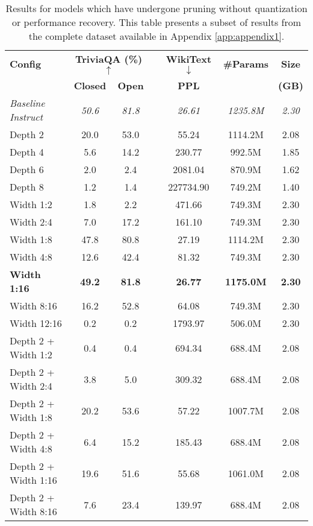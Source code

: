 {\begin{table}[!htbp]
\centering
\footnotesize
\caption[Results for Pruning-Only Configurations (Subset)]{Results for models which have undergone pruning without quantization or performance recovery. This table presents a subset of results from the complete dataset available in Appendix \ref{app:appendix1}.} \label{tab:pruning_only_results}
\label{tab:depth_pruning_results}
\begin{tabular}{lcccccc}
\hline
\textbf{Config} & \multicolumn{2}{c}{\textbf{TriviaQA (\%) $\uparrow$}} & & \textbf{WikiText $\downarrow$} & \textbf{\#Params} & \textbf{Size} \\
\cline{2-3}
& \textbf{Closed} & \textbf{Open} & & \textbf{PPL} & & \textbf{(GB)} \\
\hline
\textit{Baseline Instruct} & \textit{50.6} & \textit{81.8} & & \textit{26.61} & \textit{1235.8M} & \textit{2.30} \\
Depth 2 & 20.0 & 53.0 & & 55.24 & 1114.2M & 2.08 \\
Depth 4 & 5.6 & 14.2 & & 230.77 & 992.5M & 1.85 \\
Depth 6 & 2.0 & 2.4 & & 2081.04 & 870.9M & 1.62 \\
Depth 8 & 1.2 & 1.4 & & 227734.90 & 749.2M & 1.40 \\
Width 1:2 & 1.8 & 2.2 & & 471.66 & 749.3M & 2.30 \\
Width 2:4 & 7.0 & 17.2 & & 161.10 & 749.3M & 2.30 \\
Width 1:8 & 47.8 & 80.8 & & 27.19 & 1114.2M & 2.30 \\
Width 4:8 & 12.6 & 42.4 & & 81.32 & 749.3M & 2.30 \\
\textbf{Width 1:16} & \textbf{49.2} & \textbf{81.8} & & \textbf{26.77} & \textbf{1175.0M} & \textbf{2.30} \\
Width 8:16 & 16.2 & 52.8 & & 64.08 & 749.3M & 2.30 \\
Width 12:16 & 0.2 & 0.2 & & 1793.97 & 506.0M & 2.30 \\
Depth 2 + Width 1:2 & 0.4 & 0.4 & & 694.34 & 688.4M & 2.08 \\
Depth 2 + Width 2:4 & 3.8 & 5.0 & & 309.32 & 688.4M & 2.08 \\
Depth 2 + Width 1:8 & 20.2 & 53.6 & & 57.22 & 1007.7M & 2.08 \\
Depth 2 + Width 4:8 & 6.4 & 15.2 & & 185.43 & 688.4M & 2.08 \\
Depth 2 + Width 1:16 & 19.6 & 51.6 & & 55.68 & 1061.0M & 2.08 \\
Depth 2 + Width 8:16 & 7.6 & 23.4 & & 139.97 & 688.4M & 2.08 \\

\end{tabular}
\end{table}}
